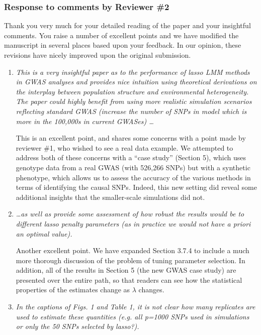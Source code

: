 \documentclass{article}
\begin{document}
\newpage

\subsubsection*{Response to comments by Reviewer \#2}

Thank you very much for your detailed reading of the paper and your insightful comments. You raise a number of excellent points and we have modified the manuscript in several places based upon your feedback.  In our opinion, these revisions have nicely improved upon the original submission.

\begin{enumerate}

\item \emph{This is a very insightful paper as to the performance of lasso LMM methods in GWAS analyses and provides nice intuition using theoretical derivations on the interplay between population structure and environmental heterogeneity. The paper could highly benefit from using more realistic simulation scenarios reflecting standard GWAS (increase the number of SNPs in model which is more in the 100,000s in current GWASes) \ldots}

  This is an excellent point, and shares some concerns with a point made by reviewer \#1, who wished to see a real data example.  We attempted to address both of these concerns with a ``case study'' (Section 5), which uses genotype data from a real GWAS (with 526,266 SNPs) but with a synthetic phenotype, which allows us to assess the accuracy of the various methods in terms of identifying the causal SNPs.  Indeed, this new setting did reveal some additional insights that the smaller-scale simulations did not.

  \item \emph{\ldots as well as provide some assessment of how robust the results would be to different lasso penalty parameters (as in practice we would not have a priori an optimal value).}

  Another excellent point.  We have expanded Section 3.7.4 to include a much more thorough discussion of the problem of tuning parameter selection.  In addition, all of the results in Section 5 (the new GWAS case study) are presented over the entire path, so that readers can see how the statistical properties of the estimates change as $\lambda$ changes.

\item \emph{In the captions of Figs. 1 and Table 1, it is not clear how many replicates are used to estimate these quantities (e.g. all p=1000 SNPs used in simulations or only the 50 SNPs selected by lasso?).}


\end{enumerate}
\end{document}
